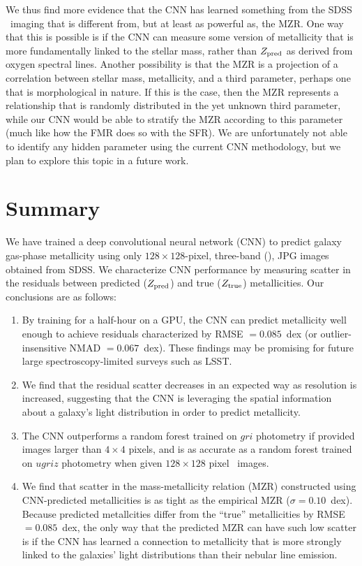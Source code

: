 \documentclass[fleqn,usenatbib]{mnras}
\begin{document}
We thus find more evidence that the CNN has learned something from the SDSS \sdssg\sdssr\sdssi\ imaging that is different from, but at least as powerful as, the MZR. One way that this is possible is if the CNN can measure some version of metallicity that is more fundamentally linked to the stellar mass, rather than $Z_{\rm pred}$ as derived from oxygen spectral lines. Another possibility is that the MZR is a projection of a correlation between stellar mass, metallicity, and a third parameter, perhaps one that is morphological in nature. If this is the case, then the \cite{Tremonti2004} MZR represents a relationship that is randomly distributed in the yet unknown third parameter, while our CNN would be able to stratify the MZR according to this parameter (much like how the FMR does so with the SFR). We are unfortunately not able to identify any hidden parameter using the current CNN methodology, but we plan to explore this topic in a future work.

\section{Summary}\label{sec:summary}
We have trained a deep convolutional neural network (CNN) to predict galaxy gas-phase metallicity using only $128 \times 128$-pixel, three-band (\sdssg\sdssr\sdssi), JPG images obtained from SDSS. We characterize CNN performance by measuring scatter in the residuals between predicted ($Z_{\rm pred}$) and true ($Z_{\rm true}$) metallicities.
Our conclusions are as follows:

\begin{enumerate}
	\item By training for a half-hour on a GPU, the CNN can predict metallicity well enough to achieve residuals characterized by RMSE $= 0.085$~dex (or outlier-insensitive NMAD $= 0.067$~dex). These findings may be promising for future large spectroscopy-limited surveys such as LSST.

	\item We find that the residual scatter decreases in an expected way as resolution is increased, suggesting that the CNN is leveraging the spatial information about a galaxy's light distribution in order to predict metallicity.

	\item The CNN outperforms a random forest trained on $gri$ photometry if provided images larger than $4\times 4$ pixels, and is as accurate as a random forest trained on $ugriz$ photometry when given $128 \times 128$ pixel \sdssg\sdssr\sdssi\ images.

	\item We find that scatter in the mass-metallicity relation (MZR) constructed using CNN-predicted metallicities is as tight as the empirical MZR ($\sigma = 0.10$~dex).	Because predicted metallcities differ from the ``true'' metallicities by RMSE $= 0.085$~dex, the only way that the predicted MZR can have such low scatter is if the CNN has learned a connection to metallicity that is more strongly linked to the galaxies' light distributions than their nebular line emission.
\end{enumerate}
\end{document}
